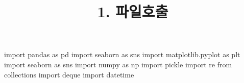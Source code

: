 \documentclass[
  letterpaper,
  DIV=11,
  numbers=noendperiod]{scrartcl}
\title{1. 파일호출}
\author{}
\date{}
\newenvironment{Shaded}{\begin{snugshade}}{\end{snugshade}}
\newcommand{\ImportTok}[1]{\textcolor[rgb]{0.00,0.46,0.62}{#1}}
\newcommand{\NormalTok}[1]{\textcolor[rgb]{0.00,0.23,0.31}{#1}}
\begin{document}
\maketitle


\begin{Shaded}
\begin{Highlighting}[]
\ImportTok{import}\NormalTok{ pandas }\ImportTok{as}\NormalTok{ pd}
\ImportTok{import}\NormalTok{ seaborn }\ImportTok{as}\NormalTok{ sns}
\ImportTok{import}\NormalTok{ matplotlib.pyplot }\ImportTok{as}\NormalTok{ plt}
\ImportTok{import}\NormalTok{ seaborn }\ImportTok{as}\NormalTok{ sns}
\ImportTok{import}\NormalTok{ numpy }\ImportTok{as}\NormalTok{ np}
\ImportTok{import}\NormalTok{ pickle}
\ImportTok{import}\NormalTok{ re}
\ImportTok{from}\NormalTok{ collections }\ImportTok{import}\NormalTok{ deque}
\ImportTok{import}\NormalTok{ datetime}
\end{Highlighting}
\end{Shaded}
\end{document}

